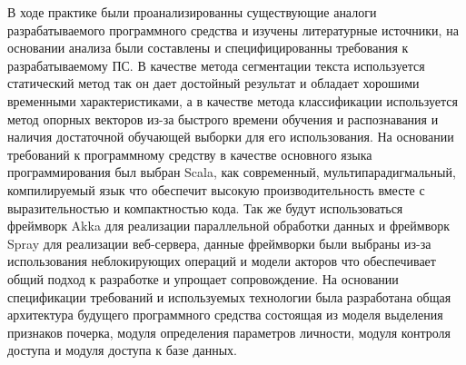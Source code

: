 \label{sec:practice_outro}

В ходе практике были проанализированны существующие аналоги разрабатываемого программного средства и изучены литературные источники, на основании анализа были составлены и специфицированны требования к разрабатываемому ПС. В качестве метода сегментации текста используется статический метод так он дает достойный результат и обладает хорошими временными характеристиками, а в качестве метода классификации используется метод опорных векторов из-за быстрого времени обучения и распознавания и наличия достаточной обучающей выборки для его использования. На основании требований к программному средству в качестве основного языка программирования был выбран Scala, как современный, мультипарадигмальный, компилируемый язык что обеспечит высокую производительность вместе с выразительностью и компактностью кода. Так же будут использоваться фреймворк Akka для реализации параллельной обработки данных и фреймворк Spray для реализации веб-сервера, данные фреймворки были выбраны из-за использования неблокирующих операций и модели акторов что обеспечивает общий подход к разработке и упрощает сопровождение. На основании спецификации требований и используемых технологии была разработана общая архитектура будущего программного средства состоящая из моделя выделения признаков почерка, модуля определения параметров личности, модуля контроля доступа и модуля доступа к базе данных.